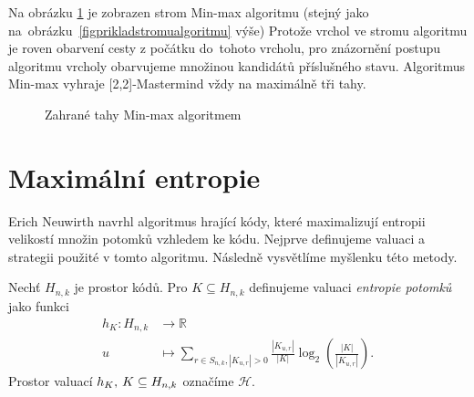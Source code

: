 Na obrázku \ref{fig22minmax} je zobrazen strom Min-max algoritmu (stejný jako na~obrázku~\ref{figprikladstromualgoritmu} výše) Protože vrchol ve stromu algoritmu je roven obarvení cesty z počátku do~tohoto vrcholu, pro znázornění postupu algoritmu vrcholy obarvujeme množinou kandidátů příslušného stavu. Algoritmus Min-max vyhraje [2,2]-Mastermind vždy na maximálně tři tahy. 
\begin{figure}[h!]
    \centering
    \caption{Zahrané tahy Min-max algoritmem}
\label{fig22minmax}
\end{figure}



\section{Maximální entropie}
Erich Neuwirth \cite{neuwirth} navrhl algoritmus hrající kódy, které maximalizují entropii velikostí množin potomků vzhledem ke kódu. Nejprve definujeme valuaci a strategii použité v tomto algoritmu. Následně vysvětlíme myšlenku této metody.

\begin{definice}\label{defentropierozdeleni}
    Nechť $H_{n,k}$ je prostor kódů. Pro $K \subseteq H_{n,k}$ definujeme valuaci \emph{entropie potomků} jako funkci
    \begin{align*}
        h_K \colon H_{n,k} &\to \mathbb{R} \\
        u &\mapsto \sum_{r\in S_{n,k}, |K_{u,r}| > 0} \frac{|K_{u,r}|}{|K|}\log_2\left( \frac{|K|}{|K_{u,r}|} \right).
    \end{align*}
    Prostor valuací $h_K, \hspace{2px} K \subseteq H_{n,k}$ označíme $\mathcal{H}$. 
\end{definice}

